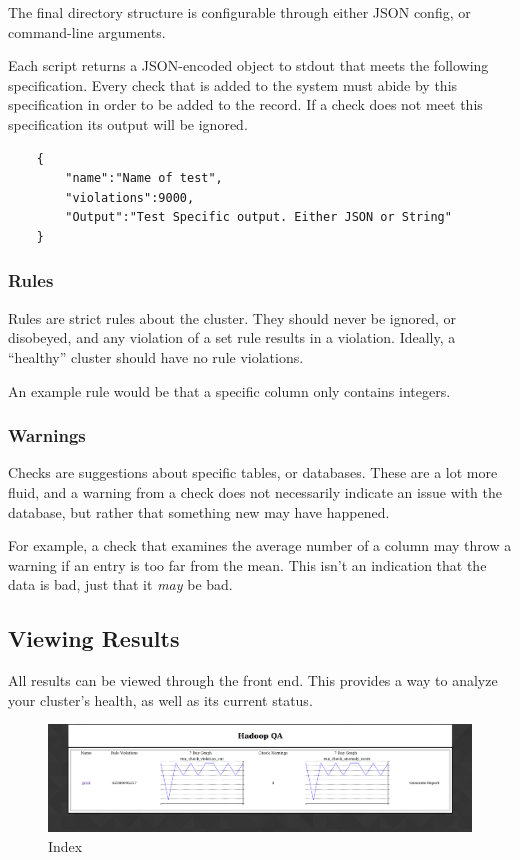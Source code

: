     The final directory structure is configurable through either JSON config, or command-line arguments.

    Each script returns a JSON-encoded object to {\ttfamily stdout} that meets the following specification. Every check
    that is added to the system must abide by this specification in order to be added to the record. If a check does
    not meet this specification its output will be ignored.

    \begin{verbatim}
    {
        "name":"Name of test",
        "violations":9000,
        "Output":"Test Specific output. Either JSON or String"
    }
    \end{verbatim}

        \subsubsection{Rules}
        Rules are strict rules about the cluster. They should never be ignored, or disobeyed, and any violation of a set rule
        results in a violation. Ideally, a ``healthy'' cluster should have no rule violations.

        An example rule would be that a specific column only contains integers.

        \subsubsection{Warnings}
        Checks are suggestions about specific tables, or databases. These are a lot more fluid, and a warning from a check does
        not necessarily indicate an issue with the database, but rather that something new may have happened.

        For example, a check that examines the average number of a column may throw a warning if an entry is too far from the
        mean. This isn't an indication that the data is bad, just that it \textit{may} be bad.

    \subsection{Viewing Results}
    All results can be viewed through the front end. This provides a way to analyze your cluster's health, as well as its
    current status.

    \begin{figure}[H]
        \centering
        \includegraphics[scale=0.2]{./img/index.png}
        \caption{Index}
    \end{figure}

